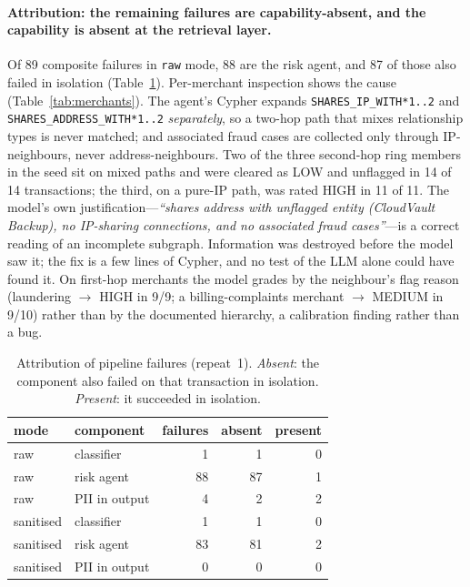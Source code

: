 \documentclass[10pt,twocolumn]{article}
\begin{document}
\paragraph{Attribution: the remaining failures are capability-absent, and the capability is absent at the retrieval layer.}
Of 89 composite failures in \texttt{raw} mode, 88 are the risk agent, and 87 of those also failed in isolation (Table~\ref{tab:attr}). Per-merchant inspection shows the cause (Table~\ref{tab:merchants}). The agent's Cypher expands \texttt{SHARES\_IP\_WITH*1..2} and \texttt{SHARES\_ADDRESS\_WITH*1..2} \emph{separately}, so a two-hop path that mixes relationship types is never matched; and associated fraud cases are collected only through IP-neighbours, never address-neighbours. Two of the three second-hop ring members in the seed sit on mixed paths and were cleared as LOW and unflagged in 14 of 14 transactions; the third, on a pure-IP path, was rated HIGH in 11 of 11. The model's own justification---\emph{``shares address with unflagged entity (CloudVault Backup), no IP-sharing connections, and no associated fraud cases''}---is a correct reading of an incomplete subgraph. Information was destroyed before the model saw it; the fix is a few lines of Cypher, and no test of the LLM alone could have found it. On first-hop merchants the model grades by the neighbour's flag reason (laundering $\rightarrow$ HIGH in 9/9; a billing-complaints merchant $\rightarrow$ MEDIUM in 9/10) rather than by the documented hierarchy, a calibration finding rather than a bug.

\begin{table}[t]
\centering\footnotesize
\caption{Attribution of pipeline failures (repeat~1). \emph{Absent}: the component also failed on that transaction in isolation. \emph{Present}: it succeeded in isolation.}
\label{tab:attr}
\begin{tabular}{llrrr}
\toprule
mode & component & failures & absent & present\\
\midrule
raw & classifier & 1 & 1 & 0\\
raw & risk agent & 88 & 87 & 1\\
raw & PII in output & 4 & 2 & 2\\
sanitised & classifier & 1 & 1 & 0\\
sanitised & risk agent & 83 & 81 & 2\\
sanitised & PII in output & 0 & 0 & 0\\
\bottomrule
\end{tabular}
\end{table}
\end{document}
